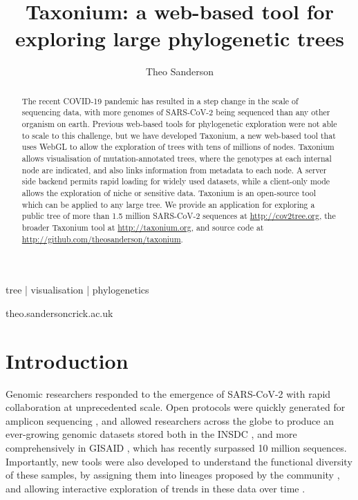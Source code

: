 
\title{Taxonium: a web-based tool for exploring large phylogenetic trees}

\author[1]{Theo Sanderson }

\date{}

\maketitle

\begin{abstract}
The recent COVID-19 pandemic has resulted in a step change in the scale of sequencing data, with more genomes of SARS-CoV-2 being sequenced than any other organism on earth. Previous web-based tools for phylogenetic exploration were not able to scale to this challenge, but we have developed Taxonium, a new web-based tool that uses WebGL to allow the exploration of trees with tens of millions of nodes. Taxonium allows visualisation of mutation-annotated trees, where the genotypes at each internal node are indicated, and also links information from metadata to each node. A server side backend permits rapid loading for widely used datasets, while a client-only mode allows the exploration of niche or sensitive data. Taxonium is an open-source tool which can be applied to any large tree. We provide an application for exploring a public tree of more than 1.5 million SARS-CoV-2 sequences at \url{http://cov2tree.org}, the broader Taxonium tool at \url{http://taxonium.org}, and source code at \url{http://github.com/theosanderson/taxonium}.


\end{abstract}

\begin{keywords}
tree | visualisation | phylogenetics
\end{keywords}

\begin{corrauthor}
theo.sanderson\at crick.ac.uk
\end{corrauthor}

\section*{Introduction}\label{s:introduction}

Genomic researchers responded to the emergence of SARS-CoV-2 with rapid collaboration at unprecedented scale. Open protocols were quickly generated for amplicon sequencing \citep{Tyson2020}, and allowed researchers across the globe to produce an ever-growing genomic datasets stored both in the INSDC \citep{insdc}, and more comprehensively in GISAID \citep{shu2017gisaid}, which has recently surpassed 10 million sequences. Importantly, new tools were also developed to understand the functional diversity of these samples, by assigning them into lineages proposed by the community \citep{rambaut2020dynamic, o2021assignment}, and allowing interactive exploration of trends in these data over time \citep{hodcroft_2021, chen2022cov, outbreakinfo}.

